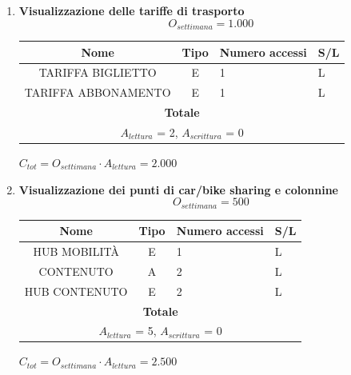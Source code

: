 \documentclass[12pt,a4paper]{report}
\begin{document}
\begin{enumerate}[label=\textbf{\arabic*)}]
    \item \textbf{Visualizzazione delle tariffe di trasporto} \\
    \[ {O_{settimana} = 1.000} \]
    \begin{table}[H]
    \centering
    \begin{tabular}{|c|c|l|l|}
    \hline
    \textbf{Nome} & \textbf{Tipo} & \textbf{Numero accessi} & \textbf{S/L} \\
    \hline
    TARIFFA BIGLIETTO & E & 1 & L \\
    \hline
    TARIFFA ABBONAMENTO & E & 1 & L \\
    \hline
    \multicolumn{4}{c}{\textbf{Totale}} \\    
    \multicolumn{4}{c}{${A_{lettura}}$ = 2, ${A_{scrittura}}$ = 0} \\
    \hline
    \end{tabular}
    \end{table}
    \begin{center}
    ${C_{tot} = {O_{settimana}}\cdot{A_{lettura}} = 2.000}$
    \end{center}

    \item \textbf{Visualizzazione dei punti di car/bike sharing e colonnine} \\
    \[ {O_{settimana} = 500} \]
    \begin{table}[H]
    \centering
    \begin{tabular}{|c|c|l|l|}
    \hline
    \textbf{Nome} & \textbf{Tipo} & \textbf{Numero accessi} & \textbf{S/L} \\
    \hline
    HUB MOBILITÀ & E & 1 & L \\
    \hline
    CONTENUTO & A & 2 & L \\
    \hline
    HUB CONTENUTO & E & 2 & L \\
    \hline
    \multicolumn{4}{c}{\textbf{Totale}} \\    
    \multicolumn{4}{c}{${A_{lettura}}$ = 5, ${A_{scrittura}}$ = 0} \\
    \hline
    \end{tabular}
    \end{table}
    \begin{center}
    ${C_{tot} = O_{settimana}\cdot{A_{lettura}} = 2.500}$
    \end{center}


\end{enumerate}
\end{document}
